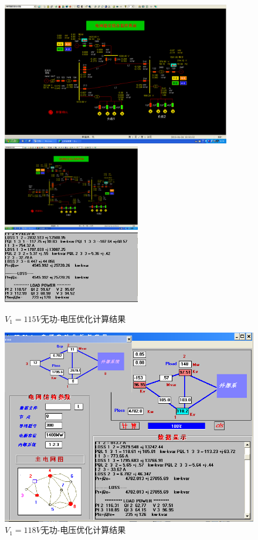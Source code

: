 \documentclass[a4paper]{ctexrep}
\begin{document}
                    \begin{figure}[htbp]
                        \centering
                        \includegraphics[width=10cm]{20.png} 
                        \includegraphics[width=6cm]{21.png} 
                        \includegraphics[width=6cm]{22.png} 
                        \caption{$V_1=115V$无功-电压优化计算结果}
                    \end{figure}

                    \begin{figure}[htbp]
                        \centering
                        \includegraphics[width=12cm]{23.png} 
                        \caption{$V_1=118V$无功-电压优化计算结果}
                    \end{figure}
\end{document}
